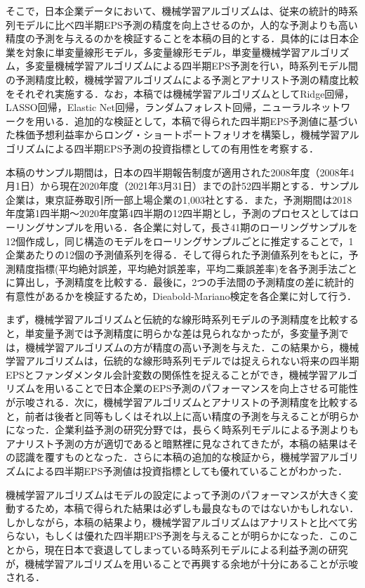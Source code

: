 \documentclass[a4paper，11pt]{jsarticle}
\begin{document}
そこで，日本企業データにおいて、機械学習アルゴリズムは、従来の統計的時系列モデルに比べ四半期EPS予測の精度を向上させるのか，人的な予測よりも高い精度の予測を与えるのかを検証することを本稿の目的とする．具体的には日本企業を対象に単変量線形モデル，多変量線形モデル，単変量機械学習アルゴリズム，多変量機械学習アルゴリズムによる四半期EPS予測を行い，時系列モデル間の予測精度比較，機械学習アルゴリズムによる予測とアナリスト予測の精度比較をそれぞれ実施する．なお，本稿では機械学習アルゴリズムとしてRidge回帰，LASSO回帰，Elastic Net回帰，ランダムフォレスト回帰，ニューラルネットワークを用いる．追加的な検証として，本稿で得られた四半期EPS予測値に基づいた株価予想利益率からロング・ショートポートフォリオを構築し，機械学習アルゴリズムによる四半期EPS予測の投資指標としての有用性を考察する．

本稿のサンプル期間は，日本の四半期報告制度が適用された2008年度（2008年4月1日）から現在2020年度（2021年3月31日）までの計52四半期とする．サンプル企業は，東京証券取引所一部上場企業の1,003社とする．また，予測期間は2018年度第1四半期～2020年度第4四半期の12四半期とし，予測のプロセスとしてはローリングサンプルを用いる．各企業に対して，長さ41期のローリングサンプルを12個作成し，同じ構造のモデルをローリングサンプルごとに推定することで，1企業あたりの12個の予測値系列を得る．そして得られた予測値系列をもとに，予測精度指標(平均絶対誤差，平均絶対誤差率，平均二乗誤差率)を各予測手法ごとに算出し，予測精度を比較する．最後に，2つの手法間の予測精度の差に統計的有意性があるかを検証するため，Dieabold-Mariano検定を各企業に対して行う．

まず，機械学習アルゴリズムと伝統的な線形時系列モデルの予測精度を比較すると，単変量予測では予測精度に明らかな差は見られなかったが，多変量予測では，機械学習アルゴリズムの方が精度の高い予測を与えた．この結果から，機械学習アルゴリズムは，伝統的な線形時系列モデルでは捉えられない将来の四半期EPSとファンダメンタル会計変数の関係性を捉えることができ，機械学習アルゴリズムを用いることで日本企業のEPS予測のパフォーマンスを向上させる可能性が示唆される．次に，機械学習アルゴリズムとアナリストの予測精度を比較すると，前者は後者と同等もしくはそれ以上に高い精度の予測を与えることが明らかになった．企業利益予測の研究分野では，長らく時系列モデルによる予測よりもアナリスト予測の方が適切であると暗黙裡に見なされてきたが，本稿の結果はその認識を覆すものとなった．さらに本稿の追加的な検証から，機械学習アルゴリズムによる四半期EPS予測値は投資指標としても優れていることがわかった．

機械学習アルゴリズムはモデルの設定によって予測のパフォーマンスが大きく変動するため，本稿で得られた結果は必ずしも最良なものではないかもしれない．しかしながら，本稿の結果より，機械学習アルゴリズムはアナリストと比べて劣らない，もしくは優れた四半期EPS予測を与えることが明らかになった．このことから，現在日本で衰退してしまっている時系列モデルによる利益予測の研究が，機械学習アルゴリズムを用いることで再興する余地が十分にあることが示唆される．

\newpage


\end{document}

